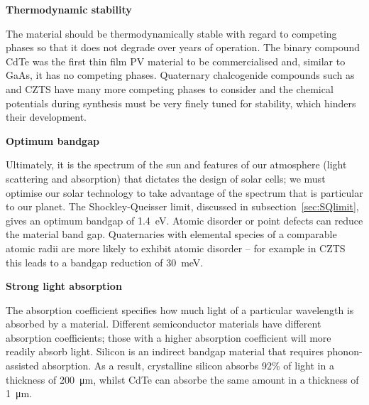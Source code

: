 \textbf{Thermodynamic stability}

The material should be thermodynamically stable with regard to competing phases so that it does not degrade over years of operation. The binary compound CdTe was the first thin film PV material to be commercialised and, similar to GaAs, it has no competing phases. Quaternary chalcogenide compounds such as  and CZTS have many more competing phases to consider and the chemical potentials during synthesis must be very finely tuned for stability, which hinders their development.


\textbf{Optimum bandgap}

Ultimately, it is the spectrum of the sun and features of our atmosphere (light scattering and absorption) that dictates the design of solar cells; we must optimise our solar technology to take advantage of the spectrum that is particular to our planet. The Shockley-Queisser limit, discussed in subsection\ \ref{sec:SQlimit}, gives an optimum bandgap of \SI{1.4}{\electronvolt}.\autocite{Ruhle2016}
Atomic disorder or point defects can reduce the material band gap. Quaternaries with elemental species of a comparable atomic radii are more likely to exhibit atomic disorder -- for example in CZTS this leads to a bandgap reduction of \SI{30}{meV}.\autocite{Rey2018}


\textbf{Strong light absorption}

The absorption coefficient specifies how much light of a particular wavelength is absorbed by a material. Different semiconductor materials have different absorption coefficients; those with a higher absorption coefficient will more readily absorb light. Silicon is an indirect bandgap material that requires phonon-assisted absorption. As a result, crystalline silicon absorbs 92\% of light in a thickness of  \SI{200}{\micro\metre}, whilst CdTe can absorbe the same amount in a thickness of \SI{1}{\micro\metre}.\autocite{Poortmans2006}


